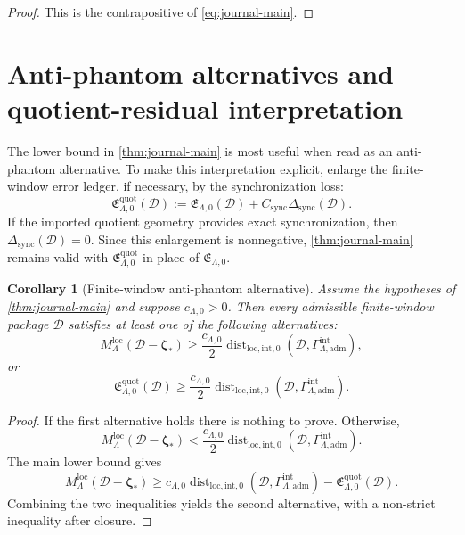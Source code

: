 \documentclass[11pt]{article}
\numberwithin{equation}{section}
\newtheorem{corollary}[corollary]{Corollary}
\theoremstyle{definition}
\theoremstyle{remark}
\newcommand{\loc}{\mathrm{loc}}
\newcommand{\intg}{\mathrm{int}}
\newcommand{\adm}{\mathrm{adm}}
\newcommand{\quot}{\mathrm{quot}}
\newcommand{\sync}{\mathrm{sync}}
\newcommand{\Dist}{\operatorname{dist}}
\newcommand{\calD}{\mathcal D}
\newcommand{\bzeta}{\boldsymbol\zeta}
\begin{document}
\begin{proof}
This is the contrapositive of \eqref{eq:journal-main}.
\end{proof}



\section{Anti-phantom alternatives and quotient-residual interpretation}\label{sec:anti-phantom-alternatives-final}

The lower bound in \cref{thm:journal-main} is most useful when read as an anti-phantom alternative.  To make this interpretation explicit, enlarge the finite-window error ledger, if necessary, by the synchronization loss:
\[
        \mathfrak E^{\quot}_{\Lambda,0}(\calD)
        :=
        \mathfrak E_{\Lambda,0}(\calD)+C_{\sync}\Delta_{\sync}(\calD).
\]
If the imported quotient geometry provides exact synchronization, then \(\Delta_{\sync}(\calD)=0\).  Since this enlargement is nonnegative, \cref{thm:journal-main} remains valid with \(\mathfrak E_{\Lambda,0}^{\quot}\) in place of \(\mathfrak E_{\Lambda,0}\).

\begin{corollary}[Finite-window anti-phantom alternative]\label{cor:final-anti-phantom-alternative}
Assume the hypotheses of \cref{thm:journal-main} and suppose \(c_{\Lambda,0}>0\).  Then every admissible finite-window package \(\calD\) satisfies at least one of the following alternatives:
\[
        M_\Lambda^{\loc}(\calD-\bzeta_*)
        \ge
        \frac{c_{\Lambda,0}}{2}
        \Dist_{\loc,\intg,0}(\calD,\Gamma^{\intg}_{\Lambda,\adm}),
\]
or
\[
        \mathfrak E^{\quot}_{\Lambda,0}(\calD)
        \ge
        \frac{c_{\Lambda,0}}{2}
        \Dist_{\loc,\intg,0}(\calD,\Gamma^{\intg}_{\Lambda,\adm}).
\]
\end{corollary}

\begin{proof}
If the first alternative holds there is nothing to prove.  Otherwise,
\[
        M_\Lambda^{\loc}(\calD-\bzeta_*)
        <
        \frac{c_{\Lambda,0}}{2}
        \Dist_{\loc,\intg,0}(\calD,\Gamma^{\intg}_{\Lambda,\adm}).
\]
The main lower bound gives
\[
        M_\Lambda^{\loc}(\calD-\bzeta_*)
        \ge
        c_{\Lambda,0}
        \Dist_{\loc,\intg,0}(\calD,\Gamma^{\intg}_{\Lambda,\adm})
        -
        \mathfrak E^{\quot}_{\Lambda,0}(\calD).
\]
Combining the two inequalities yields the second alternative, with a non-strict inequality after closure.
\end{proof}
\end{document}
